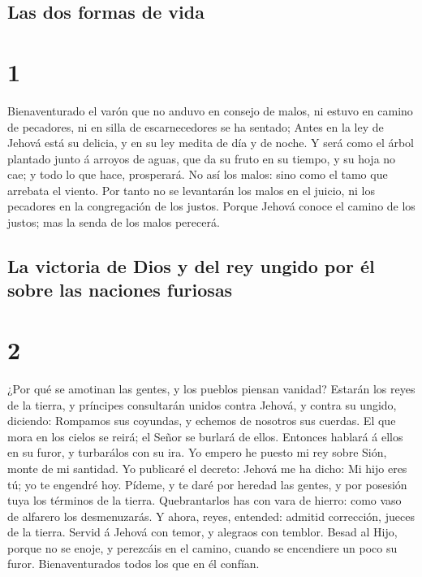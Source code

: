 \hypertarget{las-dos-formas-de-vida}{%
\subsection{Las dos formas de vida}\label{las-dos-formas-de-vida}}

\hypertarget{section}{%
\section{1}\label{section}}

 Bienaventurado el varón que no anduvo en consejo de
malos, ni estuvo en camino de pecadores, ni en silla de escarnecedores
se ha sentado;  Antes en la ley de Jehová está su delicia,
y en su ley medita de día y de noche.  Y será como el
árbol plantado junto á arroyos de aguas, que da su fruto en su tiempo, y
su hoja no cae; y todo lo que hace, prosperará.  No así
los malos: sino como el tamo que arrebata el viento.  Por
tanto no se levantarán los malos en el juicio, ni los pecadores en la
congregación de los justos.  Porque Jehová conoce el
camino de los justos; mas la senda de los malos perecerá.

\hypertarget{la-victoria-de-dios-y-del-rey-ungido-por-uxe9l-sobre-las-naciones-furiosas}{%
\subsection{La victoria de Dios y del rey ungido por él sobre las
naciones
furiosas}\label{la-victoria-de-dios-y-del-rey-ungido-por-uxe9l-sobre-las-naciones-furiosas}}

\hypertarget{section-1}{%
\section{2}\label{section-1}}

 ¿Por qué se amotinan las gentes, y los pueblos piensan
vanidad?  Estarán los reyes de la tierra, y príncipes
consultarán unidos contra Jehová, y contra su ungido, diciendo:
 Rompamos sus coyundas, y echemos de nosotros sus cuerdas.
 El que mora en los cielos se reirá; el Señor se burlará
de ellos.  Entonces hablará á ellos en su furor, y
turbarálos con su ira.  Yo empero he puesto mi rey sobre
Sión, monte de mi santidad.  Yo publicaré el decreto:
Jehová me ha dicho: Mi hijo eres tú; yo te engendré hoy. 
Pídeme, y te daré por heredad las gentes, y por posesión tuya los
términos de la tierra.  Quebrantarlos has con vara de
hierro: como vaso de alfarero los desmenuzarás.  Y ahora,
reyes, entended: admitid corrección, jueces de la tierra.
 Servid á Jehová con temor, y alegraos con temblor.
 Besad al Hijo, porque no se enoje, y perezcáis en el
camino, cuando se encendiere un poco su furor. Bienaventurados todos los
que en él confían.

